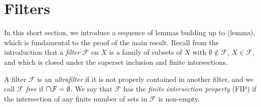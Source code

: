\section{Filters}
In this short section, we introduce a sequence of lemmas building up to (lemma), which is fundamental to the proof of the main result. Recall from the introduction that a \emph{filter} \( \mathcal{F}  \) on \( X \) is a family of subsets of \( X \) with \( \emptyset \notin \mathcal{F}  \), \( X \in \mathcal{F}  \), and which is closed under the superset inclusion and finite intersections.

A filter \( \mathcal{F}  \) is an \emph{ultrafilter} if it is not properly contained in another filter, and we call \( \mathcal{F}  \) \emph{free} if \( \medcap \mathcal{F} = \emptyset  \). We say that \( \mathcal{F}  \) has the \emph{finite intersection property} (FIP) if the intersection of any finite number of sets in \( \mathcal{F}  \) is non-empty. 

